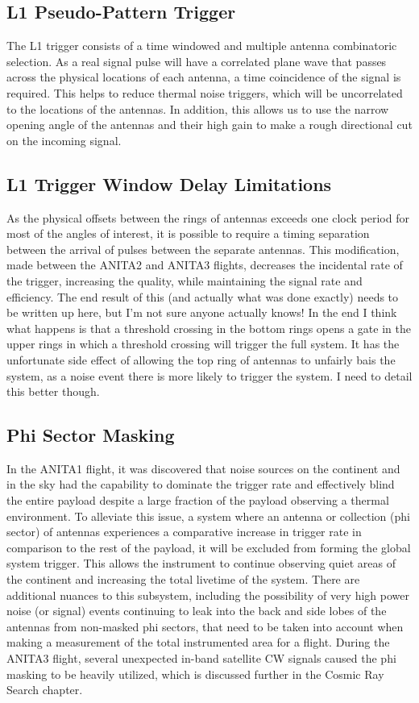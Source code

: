 		
	\subsection{L1 Pseudo-Pattern Trigger}
		The L1 trigger consists of a time windowed and multiple antenna combinatoric selection.  As a real signal pulse will have a correlated plane wave that passes across the physical locations of each antenna, a time coincidence of the signal is required.  This helps to reduce thermal noise triggers, which will be uncorrelated to the locations of the antennas.  In addition, this allows us to use the narrow opening angle of the antennas and their high gain to make a rough directional cut on the incoming signal.
		
	\subsection{L1 Trigger Window Delay Limitations}
		As the physical offsets between the rings of antennas exceeds one clock period for most of the angles of interest, it is possible to require a timing separation between the arrival of pulses between the separate antennas.  This modification, made between the ANITA2 and ANITA3 flights, decreases the incidental rate of the trigger, increasing the quality, while maintaining the signal rate and efficiency.  The end result of this (and actually what was done exactly) needs to be written up here, but I'm not sure anyone actually knows!  In the end I think what happens is that a threshold crossing in the bottom rings opens a gate in the upper rings in which a threshold crossing will trigger the full system.  It has the unfortunate side effect of allowing the top ring of antennas to unfairly bais the system, as a noise event there is more likely to trigger the system.  I need to detail this better though.

	\subsection{Phi Sector Masking}
		In the ANITA1 flight, it was discovered that noise sources on the continent and in the sky had the capability to dominate the trigger rate and effectively blind the entire payload despite a large fraction of the payload observing a thermal environment. To alleviate this issue, a system where an antenna or collection (phi sector) of antennas experiences a comparative increase in trigger rate in comparison to the rest of the payload, it will be excluded from forming the global system trigger.  This allows the instrument to continue observing quiet areas of the continent and increasing the total livetime of the system.  There are additional nuances to this subsystem, including the possibility of very high power noise (or signal) events continuing to leak into the back and side lobes of the antennas from non-masked phi sectors, that need to be taken into account when making a measurement of the total instrumented area for a flight.  During the ANITA3 flight, several unexpected in-band satellite CW signals caused the phi masking to be heavily utilized, which is discussed further in the Cosmic Ray Search chapter.
		
